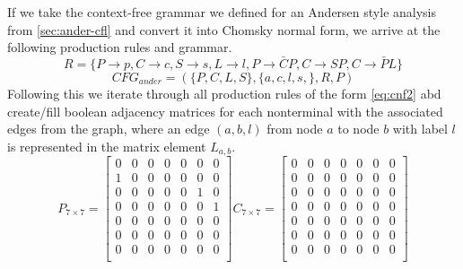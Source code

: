 If we take the context-free grammar we defined for an Andersen style analysis from \autoref{sec:ander-cfl} and convert it into Chomsky normal form, we arrive at the following production rules and grammar.
$$R=\{P\rightarrow p, C \rightarrow c, S\rightarrow s, L\rightarrow l, P\rightarrow \bar{C}P, C\rightarrow SP, C\rightarrow \bar{P}L\}$$
$$CFG_{ander}=(\{P,C,L,S\}, \{a,c,l,s,\}, R, P)$$
Following this we iterate through all production rules of the form \autoref{eq:cnf2} abd create/fill boolean adjacency matrices for each nonterminal with the associated edges from the graph, where an edge $(a,b,l)$ from node $a$ to node $b$ with label $l$ is represented in the matrix element $L_{a,b}$.
\[
    P_{7\times 7} = 
    \begin{bmatrix}
        0 & 0 & 0 & 0 & 0 & 0 & 0 \\
        1 & 0 & 0 & 0 & 0 & 0 & 0 \\
        0 & 0 & 0 & 0 & 0 & 1 & 0 \\
        0 & 0 & 0 & 0 & 0 & 0 & 1 \\
        0 & 0 & 0 & 0 & 0 & 0 & 0 \\
        0 & 0 & 0 & 0 & 0 & 0 & 0 \\
        0 & 0 & 0 & 0 & 0 & 0 & 0 \\
    \end{bmatrix}
    C_{7\times 7} = 
    \begin{bmatrix}
        0 & 0 & 0 & 0 & 0 & 0 & 0 \\
        0 & 0 & 0 & 0 & 0 & 0 & 0 \\
        0 & 0 & 0 & 0 & 0 & 0 & 0 \\
        0 & 0 & 0 & 0 & 0 & 0 & 0 \\
        0 & 0 & 0 & 0 & 0 & 0 & 0 \\
        0 & 0 & 0 & 0 & 0 & 0 & 0 \\
        0 & 0 & 0 & 0 & 0 & 0 & 0 \\
    \end{bmatrix}
\]
